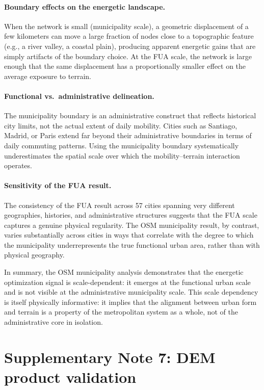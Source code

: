 \documentclass[11pt]{article}
\begin{document}
\paragraph{Boundary effects on the energetic landscape.} When the network is small (municipality scale), a geometric displacement of a few kilometers can move a large fraction of nodes close to a topographic feature (e.g., a river valley, a coastal plain), producing apparent energetic gains that are simply artifacts of the boundary choice. At the FUA scale, the network is large enough that the same displacement has a proportionally smaller effect on the average exposure to terrain.

\paragraph{Functional vs.\ administrative delineation.} The municipality boundary is an administrative construct that reflects historical city limits, not the actual extent of daily mobility. Cities such as Santiago, Madrid, or Paris extend far beyond their administrative boundaries in terms of daily commuting patterns. Using the municipality boundary systematically underestimates the spatial scale over which the mobility--terrain interaction operates.

\paragraph{Sensitivity of the FUA result.} The consistency of the FUA result across 57 cities spanning very different geographies, histories, and administrative structures suggests that the FUA scale captures a genuine physical regularity. The OSM municipality result, by contrast, varies substantially across cities in ways that correlate with the degree to which the municipality underrepresents the true functional urban area, rather than with physical geography.

In summary, the OSM municipality analysis demonstrates that the energetic optimization signal is scale-dependent: it emerges at the functional urban scale and is not visible at the administrative municipality scale. This scale dependency is itself physically informative: it implies that the alignment between urban form and terrain is a property of the metropolitan system as a whole, not of the administrative core in isolation.

\section*{Supplementary Note 7: DEM product validation}
\end{document}
